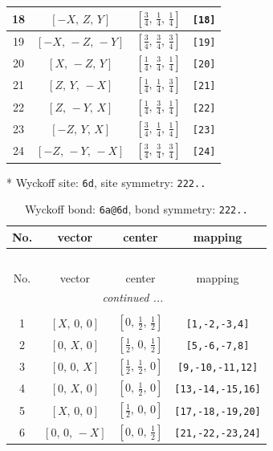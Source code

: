 \documentclass[fleqn,8pt]{jsarticle}
\begin{document}
\begin{longtable}{cccc}
18 & $\left[ - X,\, Z,\, Y \right]$ & $\left[ \frac{3}{4},\, \frac{1}{4},\, \frac{1}{4} \right]$ & {\tt [18]} \\ \hline
19 & $\left[ - X,\, - Z,\, - Y \right]$ & $\left[ \frac{3}{4},\, \frac{3}{4},\, \frac{3}{4} \right]$ & {\tt [19]} \\ \hline
20 & $\left[ X,\, - Z,\, Y \right]$ & $\left[ \frac{1}{4},\, \frac{3}{4},\, \frac{1}{4} \right]$ & {\tt [20]} \\ \hline
21 & $\left[ Z,\, Y,\, - X \right]$ & $\left[ \frac{1}{4},\, \frac{1}{4},\, \frac{3}{4} \right]$ & {\tt [21]} \\ \hline
22 & $\left[ Z,\, - Y,\, X \right]$ & $\left[ \frac{1}{4},\, \frac{3}{4},\, \frac{1}{4} \right]$ & {\tt [22]} \\ \hline
23 & $\left[ - Z,\, Y,\, X \right]$ & $\left[ \frac{3}{4},\, \frac{1}{4},\, \frac{1}{4} \right]$ & {\tt [23]} \\ \hline
24 & $\left[ - Z,\, - Y,\, - X \right]$ & $\left[ \frac{3}{4},\, \frac{3}{4},\, \frac{3}{4} \right]$ & {\tt [24]} \\
\end{longtable}
* Wyckoff site: {\tt 6d}, site symmetry: {\tt 222..}
\renewcommand{\arraystretch}{1.2}
\begin{longtable}{cccc}
\caption{Wyckoff bond: {\tt 6a@6d}, bond symmetry: {\tt 222..}}
 \\
 \hline \hline
No. & vector & center & mapping \\ \hline \endfirsthead

\multicolumn{3}{l}{\tablename\ \thetable{}} \\
 \hline \hline
No. & vector & center & mapping \\ \hline \endhead

 \hline \hline
\multicolumn{3}{r}{\footnotesize\it continued ...} \\ \endfoot

 \hline \hline
\multicolumn{3}{r}{} \\ \endlastfoot

1 & $\left[ X,\, 0,\, 0 \right]$ & $\left[ 0,\, \frac{1}{2},\, \frac{1}{2} \right]$ & {\tt [1,-2,-3,4]} \\ \hline
2 & $\left[ 0,\, X,\, 0 \right]$ & $\left[ \frac{1}{2},\, 0,\, \frac{1}{2} \right]$ & {\tt [5,-6,-7,8]} \\ \hline
3 & $\left[ 0,\, 0,\, X \right]$ & $\left[ \frac{1}{2},\, \frac{1}{2},\, 0 \right]$ & {\tt [9,-10,-11,12]} \\ \hline
4 & $\left[ 0,\, X,\, 0 \right]$ & $\left[ 0,\, \frac{1}{2},\, 0 \right]$ & {\tt [13,-14,-15,16]} \\ \hline
5 & $\left[ X,\, 0,\, 0 \right]$ & $\left[ \frac{1}{2},\, 0,\, 0 \right]$ & {\tt [17,-18,-19,20]} \\ \hline
6 & $\left[ 0,\, 0,\, - X \right]$ & $\left[ 0,\, 0,\, \frac{1}{2} \right]$ & {\tt [21,-22,-23,24]} \\
\end{longtable}
\end{document}
